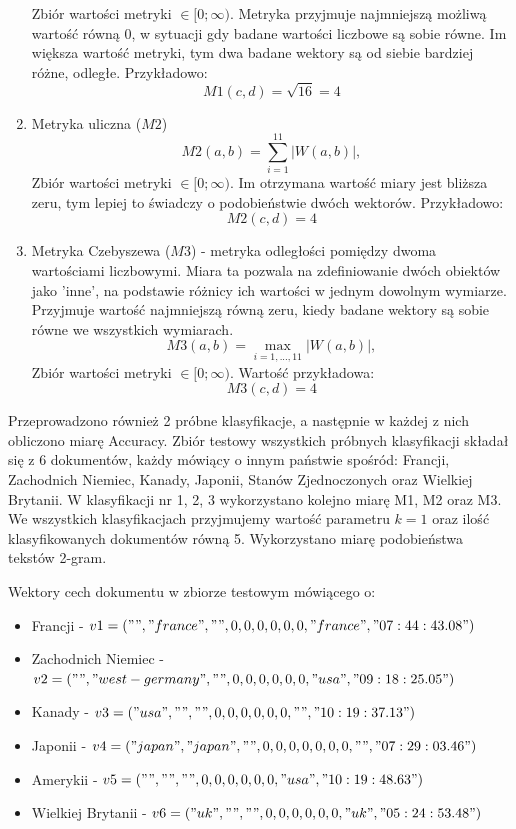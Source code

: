 \documentclass{classrep}
\begin{document}
\begin{enumerate}
  Zbiór wartości metryki $\in [0; \infty) $.
  Metryka przyjmuje najmniejszą możliwą wartość równą 0, w sytuacji gdy badane wartości liczbowe są sobie równe.
  Im większa wartość metryki, tym dwa badane wektory są od siebie bardziej różne, odległe. Przykładowo:
  \begin{equation}
    M1(c, d) = \sqrt{16} = 4
  \end{equation}
  \item Metryka uliczna ($M2$)
  \begin{equation}
    M2(a, b) = \sum_{i=1}^{11} |W(a,b)|, 
  \end{equation}
   Zbiór wartości metryki $\in [0; \infty) $.
  Im otrzymana wartość miary jest bliższa zeru, tym lepiej to świadczy o podobieństwie dwóch wektorów. Przykładowo:
  \begin{equation}
    M2(c, d) = 4
  \end{equation}
  \item Metryka Czebyszewa ($M3$) - metryka odległości pomiędzy dwoma wartościami liczbowymi. Miara ta pozwala na zdefiniowanie dwóch obiektów jako 'inne', na podstawie różnicy ich wartości w jednym dowolnym wymiarze.
  Przyjmuje wartość najmniejszą równą zeru, kiedy badane wektory są sobie równe we wszystkich wymiarach.
  \begin{equation}
    M3(a, b) = \max_{i=1, ..., 11} |W(a,b)|, 
  \end{equation}
  Zbiór wartości metryki $\in [0; \infty) $. Wartość przykładowa:
  \begin{equation}
    M3(c, d) = 4
  \end{equation}

\end{enumerate} 

Przeprowadzono również 2 próbne klasyfikacje, a następnie w każdej z nich obliczono miarę Accuracy. 
Zbiór testowy wszystkich próbnych klasyfikacji składał się z 6 dokumentów, każdy mówiący o innym państwie spośród: Francji, Zachodnich Niemiec, Kanady, Japonii, Stanów Zjednoczonych oraz Wielkiej Brytanii.
W klasyfikacji nr 1, 2, 3 wykorzystano kolejno miarę M1, M2 oraz M3. We wszystkich klasyfikacjach przyjmujemy wartość parametru $k = 1$ oraz ilość klasyfikowanych dokumentów równą 5. Wykorzystano miarę podobieństwa tekstów 2-gram.

Wektory cech dokumentu w zbiorze testowym mówiącego o:
\begin{itemize}
\item Francji - $v1 = ("", "france", "", 0, 0, 0, 0, 0, 0, "france", "07:44:43.08")$
\item Zachodnich Niemiec - $v2 = ("", "west-germany", "", 0, 0, 0, 0, 0, 0, "usa", "09:18:25.05")$
\item Kanady - $v3 = ("usa", "", "", 0, 0, 0, 0, 0, 0, "", "10:19:37.13")$
\item Japonii - $v4 = ("japan", "japan", "", 0, 0, 0, 0, 0, 0, 0, "", "07:29:03.46")$
\item Amerykii - $v5 = ("", "", "", 0, 0, 0, 0, 0, 0, "usa", "10:19:48.63")$
\item Wielkiej Brytanii - $v6 = ("uk", "", "", 0, 0, 0, 0, 0, 0, "uk", "05:24:53.48")$ \\
\end{itemize} 
\end{document}
